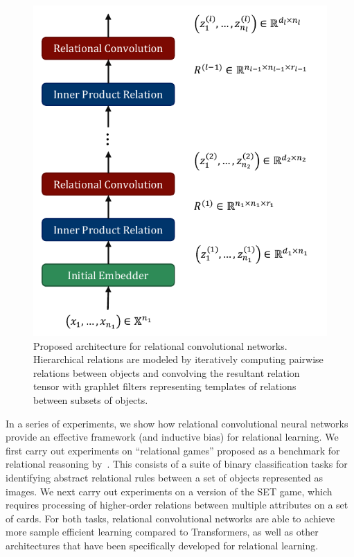 \begin{figure}
    \vskip -20pt
    \centering
    \includegraphics[width=.5\textwidth]{figs/relconv_architecture.pdf}
    \vskip-5pt
    \caption{Proposed architecture for relational convolutional networks. Hierarchical relations are modeled by iteratively computing pairwise relations between objects and convolving the resultant relation tensor with graphlet filters representing templates of relations between subsets of objects.
    }\label{fig:relconv_architecture}
\end{figure}

In a series of experiments, we show how relational convolutional neural networks provide an effective framework (and inductive bias) for relational learning. We first carry out experiments on ``relational games'' proposed as a benchmark for relational reasoning by~\citep{shanahanExplicitlyRelationalNeural}. This consists of a suite of binary classification tasks for identifying abstract relational rules between a set of objects represented as images. We next carry out experiments on a version of the SET game, which requires processing of  higher-order relations between multiple attributes on a set of cards. For both tasks, relational convolutional networks are able to achieve more sample efficient learning compared to Transformers, as well as other architectures that have been specifically developed for relational learning.

